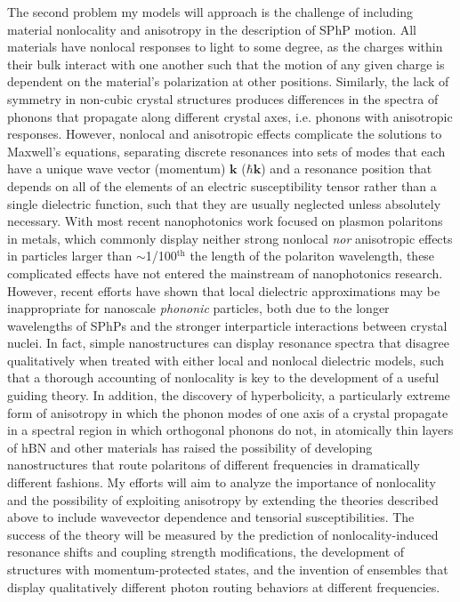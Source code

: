 \documentclass[11pt,a4paper]{article}
\begin{document}
The second problem my models will approach is the challenge of including material nonlocality and anisotropy in the description of SPhP motion. All materials have nonlocal responses to light to some degree, as the charges within their bulk interact with one another such that the motion of any given charge is dependent on the material's polarization at other positions. Similarly, the lack of symmetry in non-cubic crystal structures produces differences in the spectra of phonons that propagate along different crystal axes, i.e. phonons with anisotropic responses. However, nonlocal and anisotropic effects complicate the solutions to Maxwell's equations, separating discrete resonances into sets of modes that each have a unique wave vector (momentum) $\mathbf{k}$ ($\hbar\textbf{k}$) and a resonance position that depends on all of the elements of an electric susceptibility tensor rather than a single dielectric function, such that they are usually neglected unless absolutely necessary. With most recent nanophotonics work focused on plasmon polaritons in metals, which commonly display neither strong nonlocal \textit{nor} anisotropic effects in particles larger than $\sim$1/100$^\mathrm{th}$ the length of the polariton wavelength, these complicated effects have not entered the mainstream of nanophotonics research. However, recent efforts have shown that local dielectric approximations may be inappropriate for nanoscale \textit{phononic} particles, both due to the longer wavelengths of SPhPs and the stronger interparticle interactions between crystal nuclei. In fact, simple nanostructures can display resonance spectra that disagree qualitatively when treated with either local and nonlocal dielectric models, such that a thorough accounting of nonlocality is key to the development of a useful guiding theory.\supercite{gubbin_optical_2020,gubbin_perspective_2021} In addition, the discovery of hyperbolicity, a particularly extreme form of anisotropy in which the phonon modes of one axis of a crystal propagate in a spectral region in which orthogonal phonons do not, in atomically thin layers of hBN and other materials has raised the possibility of developing nanostructures that route polaritons of different frequencies in dramatically different fashions. My efforts will aim to analyze the importance of nonlocality and the possibility of exploiting anisotropy by extending the theories described above to include wavevector dependence and tensorial susceptibilities. The success of the theory will be measured by the prediction of nonlocality-induced resonance shifts and coupling strength modifications, the development of structures with momentum-protected states, and the invention of ensembles that display qualitatively different photon routing behaviors at different frequencies.
\end{document}

